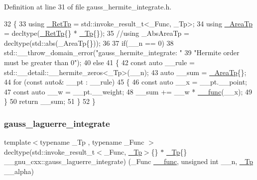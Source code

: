 Definition at line 31 of file gauss\+\_\+hermite\+\_\+integrate.\+h.


\begin{DoxyCode}
32   \{
33     \textcolor{keyword}{using} \hyperlink{namespace____gnu__cxx_a886e03ece3d53ff7fa6c098a40f93fa5}{\_RetTp} = std::invoke\_result\_t<\_Func, \_Tp>;
34     \textcolor{keyword}{using} \hyperlink{namespace____gnu__cxx_ae97a51b75e19c30f48d27fac4664de6e}{\_AreaTp} = decltype(\hyperlink{namespace____gnu__cxx_a886e03ece3d53ff7fa6c098a40f93fa5}{\_RetTp}\{\} * \hyperlink{namespace____gnu__cxx_a3b19a9c800ca194374ef9172290f7d79}{\_Tp}\{\});
35     \textcolor{comment}{//using \_AbsAreaTp = decltype(std::abs(\_AreaTp\{\}));}
36 
37     \textcolor{keywordflow}{if}(\_\_n == 0)
38       std::\_\_throw\_domain\_error(\textcolor{stringliteral}{"gauss\_hermite\_integrate: "}
39                                 \textcolor{stringliteral}{"Hermite order must be greater than 0"});
40     \textcolor{keywordflow}{else}
41      \{
42         \textcolor{keyword}{const} \textcolor{keyword}{auto} \_\_rule = std::\_\_detail::\_\_hermite\_zeros<\_Tp>(\_\_n);
43         \textcolor{keyword}{auto} \_\_sum = \hyperlink{namespace____gnu__cxx_ae97a51b75e19c30f48d27fac4664de6e}{\_AreaTp}\{\};
44         \textcolor{keywordflow}{for} (\textcolor{keyword}{const} \textcolor{keyword}{auto}& \_\_pt : \_\_rule)
45           \{
46             \textcolor{keyword}{const} \textcolor{keyword}{auto} \_\_x = \_\_pt.\_\_point;
47             \textcolor{keyword}{const} \textcolor{keyword}{auto} \_\_w = \_\_pt.\_\_weight;
48             \_\_sum += \_\_w * \hyperlink{namespace____gnu__cxx_af2b2f0c7a2ae72b922b1afefae5a65b2}{\_\_func}(\_\_x);
49           \}
50         \textcolor{keywordflow}{return} \_\_sum;
51       \}
52   \}
\end{DoxyCode}
\mbox{\label{namespace____gnu__cxx_a93b814c5d08779f98698e863d0e21a5f}} 
\subsubsection{\texorpdfstring{gauss\+\_\+laguerre\+\_\+integrate}{gauss\_laguerre\_integrate}}
{\footnotesize\ttfamily template$<$typename \+\_\+\+Tp , typename \+\_\+\+Func $>$ \\
decltype(std\+::invoke\+\_\+result\+\_\+t$<$\+\_\+\+Func, \hyperlink{namespace____gnu__cxx_a3b19a9c800ca194374ef9172290f7d79}{\+\_\+\+Tp}$>$\{\} $\ast$ \hyperlink{namespace____gnu__cxx_a3b19a9c800ca194374ef9172290f7d79}{\+\_\+\+Tp}\{\} \+\_\+\+\_\+gnu\+\_\+cxx\+::gauss\+\_\+laguerre\+\_\+integrate) (\+\_\+\+Func \hyperlink{namespace____gnu__cxx_af2b2f0c7a2ae72b922b1afefae5a65b2}{\+\_\+\+\_\+func}, unsigned int \+\_\+\+\_\+n, \hyperlink{namespace____gnu__cxx_a3b19a9c800ca194374ef9172290f7d79}{\+\_\+\+Tp} \+\_\+\+\_\+alpha)}



